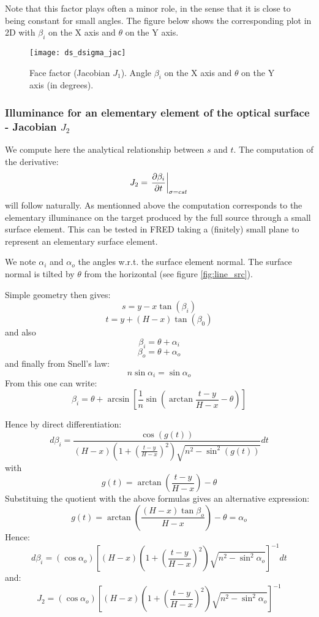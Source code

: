 Note that this factor plays often a minor role, in the sense that it is close
to being constant for small angles.
The figure below shows the corresponding plot in 2D with $\beta_i$ on the X axis
and $\theta$ on the Y axis.

\begin{figure}[!htbp]
\centering
\texttt{[image: ds\_dsigma\_jac]} 
\caption{Face factor (Jacobian $J_1$). Angle $\beta_i$ on the X axis
and $\theta$ on the Y axis (in degrees).}
\label{fig:ds_dsigma_jac}
\end{figure}


\subsubsection*{Illuminance for an elementary element of the 
optical surface - Jacobian $J_2$}
We compute here the analytical relationship between $s$
and $t$. The computation of the derivative:
\[J_2 = \left. \frac{\partial{\beta_i}}{\partial{t}} \right|_{\sigma=cst}\]
 will follow naturally.
As mentionned above the computation corresponds to the elementary illuminance
on the target produced by the full source through a small surface
element. This can be tested in FRED taking a (finitely) small plane
to represent an elementary surface element.

We note $\alpha_i$ and $\alpha_o$ the
angles w.r.t. the surface element normal. The surface normal is tilted
by $\theta$ from the horizontal (see figure \ref{fig:line_src}).

Simple geometry then gives:
\[ s = y - x\tan(\beta_i) \]
\[ t = y + (H-x)\tan(\beta_0) \]
and also
\[\beta_i = \theta + \alpha_i \]
\[\beta_o = \theta + \alpha_o \]
and finally from Snell's law:
\[ n \sin\alpha_i = \sin\alpha_o \]
From this one can write:
\[ \beta_i = \theta + \arcsin\left[ \frac{1}{n} 
		\sin(\arctan\frac{t-y}{H-x} - \theta)
 \right]\]

Hence by direct differentiation:
\[ d\beta_i = \frac{\cos(g(t)) }
{ (H-x) \left( 1+(\frac{t-y}{H-x})^2 \right) \sqrt{n^2 - \sin^2(g(t))}} dt\]
with 
\[ g(t) = \arctan\left(\frac{t-y}{H-x}\right) - \theta\]
Substituing the quotient with the above formulas gives an alternative
expression:
\[ g(t) = \arctan\left(\frac{(H-x)\tan\beta_o}{H-x}\right) - \theta = \alpha_o\]
Hence:
\[ d\beta_i = (\cos \alpha_o)
\left[ (H-x) \left( 1+(\frac{t-y}{H-x})^2 \right) \sqrt{n^2 - 
\sin^2 \alpha_o} \right]^{-1} dt\]
and:
\[ J_2 = (\cos \alpha_o)
\left[ (H-x) \left( 1+(\frac{t-y}{H-x})^2 \right) \sqrt{n^2 - 
\sin^2 \alpha_o} \right]^{-1} \]


